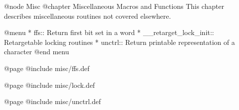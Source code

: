 @node Misc
@chapter Miscellaneous Macros and Functions
This chapter describes miscellaneous routines not covered elsewhere.

@menu 
* ffs::      Return first bit set in a word
* __retarget_lock_init::     Retargetable locking routines
* unctrl::   Return printable representation of a character
@end menu

@page
@include misc/ffs.def

@page
@include misc/lock.def

@page
@include misc/unctrl.def
